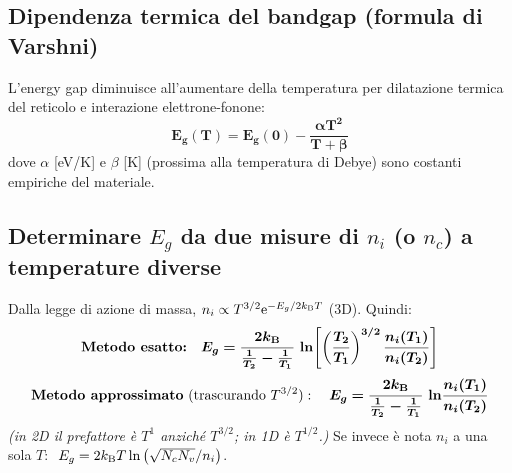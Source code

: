 
\subsection{Dipendenza termica del bandgap (formula di Varshni)}
L'energy gap diminuisce all'aumentare della temperatura per dilatazione termica del reticolo e interazione elettrone-fonone:
\[ \bm{E_g(T) = E_g(0) - \frac{\alpha T^2}{T+\beta}} \]
dove $\alpha$ [eV/K] e $\beta$ [K] (prossima alla temperatura di Debye) sono costanti empiriche del materiale.

\subsection{Determinare $E_g$ da due misure di $n_i$ (o $n_c$) a temperature diverse}
Dalla legge di azione di massa, $n_i\propto T^{3/2}\mathrm{e}^{-E_g/2k_{\mathrm{B}} T}$ (3D). Quindi:
\[ \textbf{Metodo esatto:}\quad \bm{E_g = \frac{2k_{\mathrm{B}}}{\frac{1}{T_2}-\frac{1}{T_1}}\,\ln\!\left[\left(\frac{T_2}{T_1}\right)^{3/2}\frac{n_i(T_1)}{n_i(T_2)}\right]} \]
\[ \textbf{Metodo approssimato}\ (\text{trascurando } T^{3/2}):\quad
   \bm{E_g = \frac{2\kB}{\frac{1}{T_2}-\frac{1}{T_1}}\,\ln\!\frac{n_i(T_1)}{n_i(T_2)}} \]
\textit{(in 2D il prefattore è $T^1$ anziché $T^{3/2}$; in 1D è $T^{1/2}$.)}
Se invece è nota $n_i$ a una sola $T$: $\ E_g = 2k_{\mathrm{B}} T\ln\left(\sqrt{N_cN_v}/n_i\right)$.

\newpage
